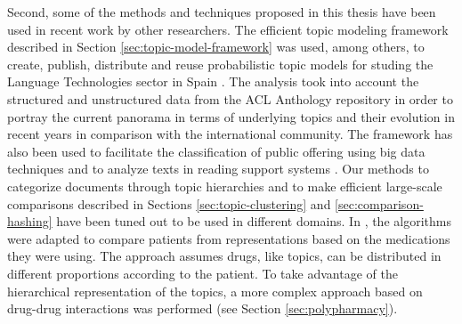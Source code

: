 Second, some of the methods and techniques proposed in this thesis have been used in recent work by other researchers. The efficient topic modeling framework described in Section \ref{sec:topic-model-framework} was used, among others, to create, publish, distribute and reuse probabilistic topic models for studing the Language Technologies sector in Spain \citep{Samy2019}. The analysis took into account the structured and unstructured data from the ACL Anthology repository in order to portray the current panorama in terms of underlying topics and their evolution in recent years in comparison with the international community. The framework has also been used to facilitate the classification of public offering using big data techniques \citep{Olga2019} and to analyze texts in reading support systems \citep{Teresa2020}. Our methods to categorize documents through topic hierarchies and to make efficient large-scale comparisons described in Sections \ref{sec:topic-clustering} and \ref{sec:comparison-hashing} have been tuned out to be used in different domains. In \citep{Badenes-Olmedo2019c}, the algorithms were adapted to compare patients from representations based on the medications they were using. The approach assumes drugs, like topics, can be distributed in different proportions according to the patient. To take advantage of the hierarchical representation of the topics, a more complex approach based on drug-drug interactions was performed (see Section \ref{sec:polypharmacy}).

